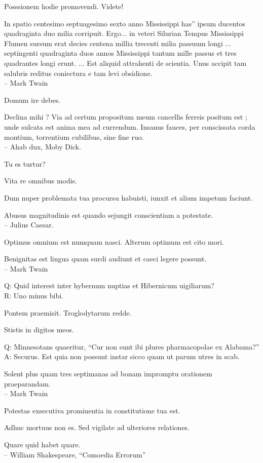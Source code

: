 \documentclass[titlepage,12pt]{memoir}
\begin{document}
Posssionem hodie promovendi. Videte!

In spatio centesimo septuagesimo sexto anno Mississippi has”
ipsum ducentos quadraginta duo milia corripuit. Ergo... in veteri
Silurian Tempus Mississippi Flumen sursum erat decies centena millia trecenti
milia passuum longi ... septingenti quadraginta duos annos
Mississippi tantum mille passus et tres quadrantes longi erunt. ... Est
aliquid attrahenti de scientia. Unus accipit tam salubris reditus
coniectura e tam levi obsidione.
\\-- Mark Twain

Domum ire debes.

 Declina mihi ? Via ad certum propositum meum cancellis ferreis positum est ;
unde sulcata est anima mea ad currendum. Insanus fauces, per
conscissata corda montium, torrentium cubilibus, sine fine ruo.
\\-- Ahab dux, Moby Dick.

Tu es turtur?

Vita re omnibus modis.

Dum nuper problemata tua procursu habuisti, iunxit et
alium impetum faciunt.

Abusus magnitudinis est quando sejungit conscientiam a potestate.
\\-- Julius Caesar.

Optimus omnium est numquam nasci. Alterum optimum est cito mori.

 Benignitas est lingua quam surdi audiunt et caeci legere possunt.
\\-- Mark Twain

Q: Quid interest inter hybernum nuptias et Hibernicum uigiliarum?\\
R: Uno minus bibi.

Pontem praemisit. Troglodytarum redde.

Stistis in digitos meos.

Q: Minnesotans quaeritur, “Cur non sunt ibi plures pharmacopolae ex Alabama?”\\
A: Securus. Est quia non possunt instar sicco quam ut parum
utres in scab.

Solent plus quam tres septimanas ad bonam impromptu orationem praeparandam.
\\-- Mark Twain

Potestas exsecutiva prominentia in constitutione tua est.

Adhuc mortuus non es. Sed vigilate ad ulteriores relationes.

Quare quid habet quare.
\\-- William Shakespeare, “Comoedia Errorum”
\end{document}
